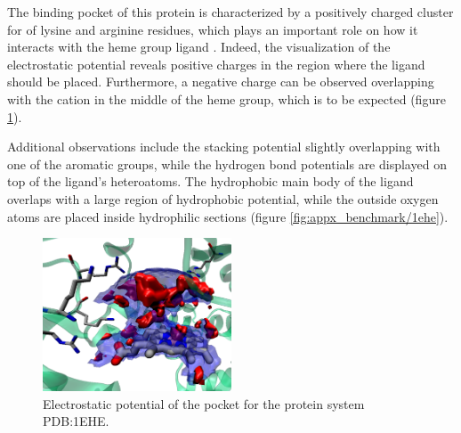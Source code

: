       The binding pocket of this protein is characterized by a positively charged cluster for of lysine and arginine residues, which plays an important role on how it interacts with the heme group ligand \cite{benchmark_positive_2001}. Indeed, the visualization of the electrostatic potential reveals positive charges in the region where the ligand should be placed. Furthermore, a negative charge can be observed overlapping with the cation in the middle of the heme group, which is to be expected (figure \ref{fig:benchmark/1ehe}).

      Additional observations include the stacking potential slightly overlapping with one of the aromatic groups, while the hydrogen bond potentials are displayed on top of the ligand's heteroatoms. The hydrophobic main body of the ligand overlaps with a large region of hydrophobic potential, while the outside oxygen atoms are placed inside hydrophilic sections (figure \ref{fig:appx_benchmark/1ehe}).

      \begin{figure}[H]
        \centering
        \includegraphics[width=0.5\textwidth]{figures/results/benchmark_prot/1ehe.png}
        \caption{\label{fig:benchmark/1ehe} Electrostatic potential of the pocket for the protein system PDB:1EHE.}
      \end{figure}
    \pagebreak

